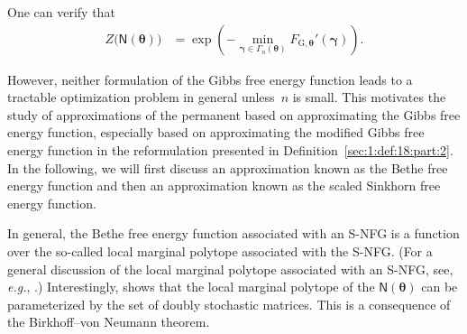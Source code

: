 \documentclass[journal,lettersize,twocolumn]{IEEEtran} %
\newcommand{\vect}[1]{ \bm{#1} }
\newcommand{\vgam}{ \vect{\gamma} }
\newcommand{\sfN}{ \mathsf{N} }
\newcommand{\matr}[1]{ \bm{#1} }
\newcommand{\mtheta}{\matr{\theta}}
\newcommand{\vtheta}{\matr{\theta}}
\newcommand{\FGthe}{F_{ \mathrm{G}, \mtheta }}
\newcommand{\eg}{\textit{e.g.}}
\begin{document}
%
%

%

One can verify that
\begin{align*}
  Z\bigl( \sfN(\mtheta) \bigr) 
    &= \exp
         \left( 
           - \min_{\vgam \in \Gamma_{n}(\vtheta)} \FGthe'(\vgam)
         \right).
\end{align*}

%

However, neither formulation of the Gibbs free energy function leads to a
tractable optimization problem in general unless~$n$ is small. This motivates
the study of approximations of the permanent based on approximating the Gibbs
free energy function, especially based on approximating the modified Gibbs
free energy function in the reformulation presented in
Definition~\ref{sec:1:def:18:part:2}. In the following, we will first discuss
an approximation known as the Bethe free energy function and then an
approximation known as the scaled Sinkhorn free energy function.

%

In general, the Bethe free energy function associated with an S-NFG is a
function over the so-called local marginal polytope associated with the
S-NFG. (For a general discussion of the local marginal polytope associated
with an S-NFG, see, \eg, \cite[Section 4]{Wainwright2008}.) Interestingly,
\cite[Section~IV]{Vontobel2013a} shows that the local marginal polytope of the
$\sfN(\mtheta)$ can be parameterized by the set of doubly stochastic
matrices. This is a consequence of the Birkhoff--von Neumann theorem.

%
\end{document}
